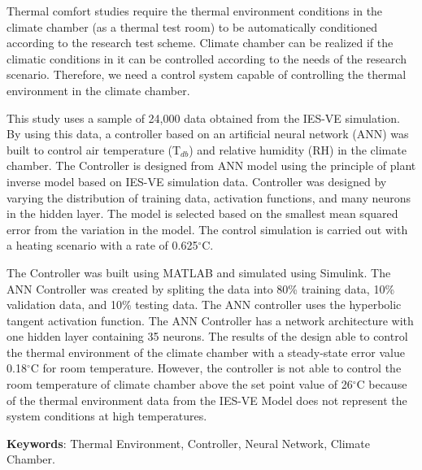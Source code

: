 Thermal comfort studies require the thermal environment conditions in the climate chamber (as a thermal test room) to be automatically conditioned according to the research test scheme. Climate chamber can be realized if the climatic conditions in it can be controlled according to the needs of the research scenario. Therefore, we need a control system capable of controlling the thermal environment in the climate chamber. 

This study uses a sample of 24,000 data obtained from the IES-VE simulation. By using this data, a controller based on an artificial neural network (ANN) was built to control air temperature (T$_{db}$) and relative humidity (RH) in the climate chamber. The Controller is designed from ANN model using the principle of plant inverse model based on IES-VE simulation data. Controller was designed by varying the distribution of training data, activation functions, and many neurons in the hidden layer. The model is selected based on the smallest mean squared error from the variation in the model. The control simulation is carried out with a heating scenario with a rate of 0.625$^\circ$C. %

The Controller was built using MATLAB and simulated using Simulink. The ANN Controller was created by spliting the data into 80\% training data, 10\% validation data, and 10\% testing data. The ANN controller uses the hyperbolic tangent activation function. The ANN Controller has a network architecture with one hidden layer containing 35 neurons. The results of the design able to control the thermal environment of the climate chamber with a steady-state error value 0.18$^\circ$C for room temperature. However, the controller is not able to control the room temperature of climate chamber above the set point value of 26$^\circ$C because of the thermal environment data from the IES-VE Model does not represent the system conditions at high temperatures.

\vspace{0.4cm}
\hspace{-1.2cm}
\textbf{Keywords}: Thermal Environment, Controller, Neural Network, Climate Chamber.


